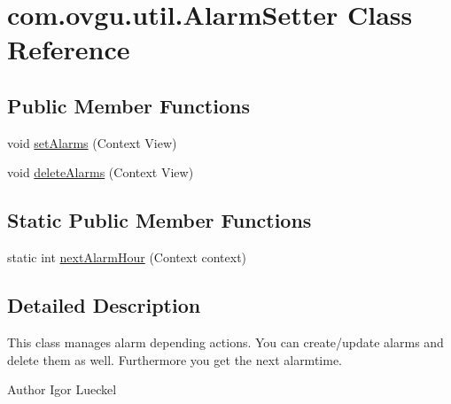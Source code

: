 \hypertarget{classcom_1_1ovgu_1_1util_1_1_alarm_setter}{\section{com.\-ovgu.\-util.\-Alarm\-Setter Class Reference}
\label{classcom_1_1ovgu_1_1util_1_1_alarm_setter}
}
\subsection*{Public Member Functions}
\begin{DoxyCompactItemize}
\item 
void \hyperlink{classcom_1_1ovgu_1_1util_1_1_alarm_setter_a3d9f6595eb50d589ae8cbd6b166cd35f}{set\-Alarms} (Context View)
\item 
void \hyperlink{classcom_1_1ovgu_1_1util_1_1_alarm_setter_aea60dad39f961c9a7b2c89fa0942fd73}{delete\-Alarms} (Context View)
\end{DoxyCompactItemize}
\subsection*{Static Public Member Functions}
\begin{DoxyCompactItemize}
\item 
static int \hyperlink{classcom_1_1ovgu_1_1util_1_1_alarm_setter_a243b08571208b397b09546608a3ac588}{next\-Alarm\-Hour} (Context context)
\end{DoxyCompactItemize}


\subsection{Detailed Description}
This class manages alarm depending actions. You can create/update alarms and delete them as well. Furthermore you get the next alarmtime. \begin{DoxyAuthor}{Author}
Igor Lueckel 
\end{DoxyAuthor}


